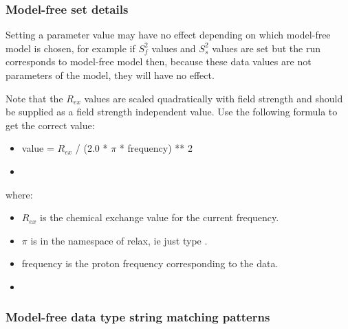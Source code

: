   
 \subsubsection{Model-free set details} 

 Setting a parameter value may have no effect depending on which model-free model is chosen, for example if $S^2_f$ values and $S^2_s$ values are set but the run corresponds to model-free model  then, because these data values are not parameters of the model, they will have no effect. 
  

 Note that the $R_{ex}$ values are scaled quadratically with field strength and should be supplied as a field strength independent value.  Use the following formula to get the correct value: 
  

 \begin{itemize} 
 \item[] value = $R_{ex}$ / (2.0 * $\pi$ * frequency) ** 2  
 \item[]  
 \end{itemize} 
  

 where: 
  

 \begin{itemize} 
 \item[] $R_{ex}$ is the chemical exchange value for the current frequency.  
 \item[] $\pi$ is in the namespace of relax, ie just type .  
 \item[] frequency is the proton frequency corresponding to the data.  
 \item[]  
 \end{itemize} 
  

  
 \subsubsection{Model-free data type string matching patterns} 

